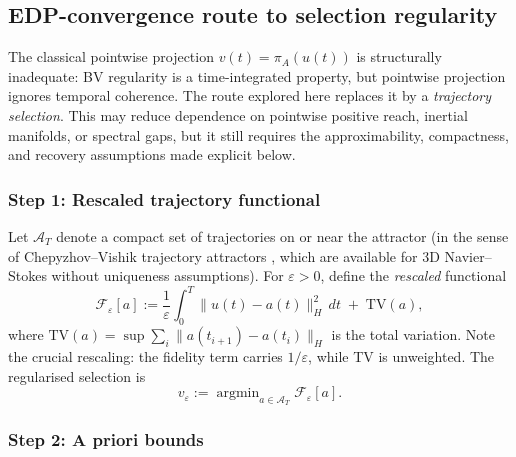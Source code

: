 \documentclass[12pt,a4paper]{article}
\theoremstyle{definition}
\theoremstyle{plain}
\theoremstyle{remark}
\begin{document}
\subsection{EDP-convergence route to selection regularity}\label{sec:gamma-edp-selection}

The classical pointwise projection $v(t) = \pi_A(u(t))$ is structurally inadequate: BV regularity is a time-integrated property, but pointwise projection ignores temporal coherence. The route explored here replaces it by a \emph{trajectory selection}. This may reduce dependence on pointwise positive reach, inertial manifolds, or spectral gaps, but it still requires the approximability, compactness, and recovery assumptions made explicit below.

\subsubsection*{Step 1: Rescaled trajectory functional}

Let $\mathcal{A}_T$ denote a compact set of trajectories on or near the attractor (in the sense of Chepyzhov--Vishik trajectory attractors \cite{ChepyzhovVishik2002}, which are available for 3D Navier--Stokes without uniqueness assumptions). For $\varepsilon > 0$, define the \emph{rescaled} functional
\begin{equation}\label{eq:trajectory-functional}
  \mathcal{F}_\varepsilon[a] := \frac{1}{\varepsilon}\int_0^T \|u(t) - a(t)\|_H^2 \, dt \;+\; \mathrm{TV}(a),
\end{equation}
where $\mathrm{TV}(a) = \sup \sum_{i} \|a(t_{i+1}) - a(t_i)\|_H$ is the total variation. Note the crucial rescaling: the fidelity term carries $1/\varepsilon$, while TV is unweighted. The regularised selection is
\begin{equation}\label{eq:reg-selection}
  v_\varepsilon := \operatorname{argmin}_{a \in \mathcal{A}_T} \mathcal{F}_\varepsilon[a].
\end{equation}

\subsubsection*{Step 2: A priori bounds}
\end{document}
